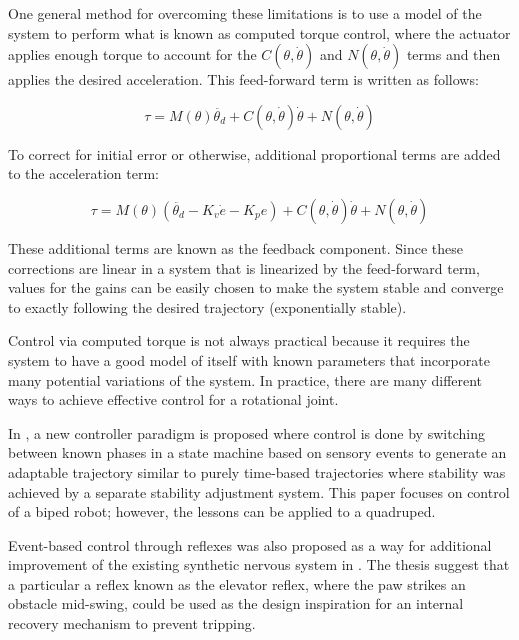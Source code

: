 One general method for overcoming these limitations is to use a model of the 
system to perform what is known as computed torque control, where the actuator
applies enough torque to account for the $C(\theta, \dot{\theta})$ and
$N(\theta, \dot{\theta})$ terms and then applies the desired acceleration. This feed-forward term is written as follows:

\begin{equation}
\tau = M(\theta) \ddot{\theta_{d}} + C(\theta, \dot{\theta}) \dot{\theta} + N(\theta, \dot{\theta})
\end{equation}

To correct for initial error or otherwise, additional proportional terms are
added to the acceleration term:

\begin{equation}
\tau = M(\theta) (\ddot{\theta_{d}} - K_{v} \dot{e} - K_{p} e) + C(\theta, \dot{\theta}) \dot{\theta} + N(\theta, \dot{\theta})
\end{equation}

These additional terms are known as the feedback component. Since these 
corrections are linear in a system that is linearized by the feed-forward term,
values for the gains can be easily chosen to make the system stable and converge
to exactly following the desired trajectory (exponentially stable). \cite{MLS94}

Control via computed torque 
is not always practical because it requires the system to have a good model of 
itself with known parameters that incorporate many potential variations of the
system. In practice, 
there are many different ways to achieve effective control for a rotational 
joint.


In \cite{EventBasedWalking}, a new controller paradigm is proposed where control
is done by switching between known phases in a state machine based on sensory
events to generate an adaptable trajectory similar to purely time-based
trajectories where stability was achieved by a separate stability adjustment
system. This paper focuses on control of a biped robot; however, the lessons can
be applied to a quadruped.

Event-based control through reflexes was also proposed as a way for additional
improvement of the existing synthetic nervous system in \cite{HuntPhDThesis}.
The thesis suggest that a particular a reflex known as the elevator reflex,
where the paw strikes an
obstacle mid-swing, could be used as the design inspiration for an internal recovery
mechanism to prevent tripping.

